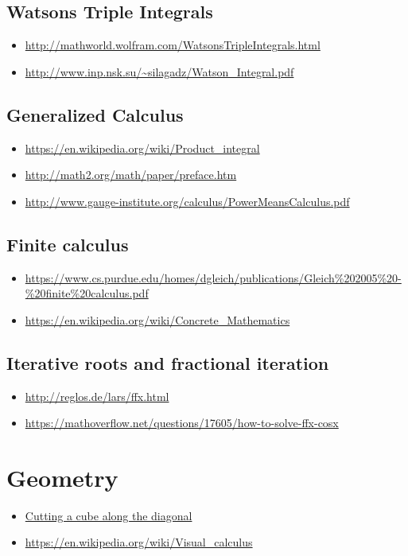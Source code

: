 \subsection{Watsons Triple Integrals}
\begin{itemize}
\item \url{http://mathworld.wolfram.com/WatsonsTripleIntegrals.html}
\item \url{http://www.inp.nsk.su/~silagadz/Watson_Integral.pdf}
\end{itemize}

\subsection{Generalized Calculus}
\begin{itemize}
\item \url{https://en.wikipedia.org/wiki/Product_integral}
\item \url{http://math2.org/math/paper/preface.htm}
\item \url{http://www.gauge-institute.org/calculus/PowerMeansCalculus.pdf}
\end{itemize}

\subsection{Finite calculus}
\begin{itemize}
\item \url{https://www.cs.purdue.edu/homes/dgleich/publications/Gleich\%202005\%20-\%20finite\%20calculus.pdf}
\item \url{https://en.wikipedia.org/wiki/Concrete_Mathematics}
\end{itemize}

\subsection{Iterative roots and fractional iteration}
\begin{itemize}
\item \url{http://reglos.de/lars/ffx.html}
\item \url{https://mathoverflow.net/questions/17605/how-to-solve-ffx-cosx}
\end{itemize}

\section{Geometry}
\begin{itemize}
\item \href{https://www.friedrich-verlag.de/fileadmin/redaktion/sekundarstufe/Mathematik/Der_Mathematikunterricht/Leseproben/Der_Mathematikunterricht_3_13_Leseprobe_2.pdf}{Cutting a cube along the diagonal}
\item \url{https://en.wikipedia.org/wiki/Visual_calculus}
\end{itemize}

